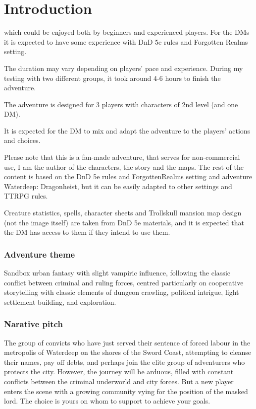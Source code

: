 \documentclass[10pt,onecolumn,twoside,openany,bg=full,layout=true]{dndbook}
\begin{document}
\tableofcontents

\mainmatter

\twocolumn
\chapter{Introduction}\label{ch:introduction}
which could be enjoyed both by beginners and experienced players.
For the DMs it is expected to have some experience with DnD 5e rules and Forgotten Realms setting.

The duration may vary depending on players' pace and experience.
During my testing with two different groups, it took around 4-6 hours to finish the adventure.

The adventure is designed for 3 players with characters of 2nd level (and one DM).

It is expected for the DM to mix and adapt the adventure to the players' actions and choices.

Please note that this is a fan-made adventure, that serves for non-commercial use, I am the author of the characters,
the story and the maps.
The rest of the content is based on the DnD 5e rules and ForgottenRealms setting and adventure Waterdeep: Dragonheist, but it can be easily adapted to other
settings and TTRPG rules.

Creature statistics, spells, character sheets and Trollskull mansion map design (not the image itself) are taken from DnD 5e materials,
and it is expected that the DM has access to them if they intend to use them.


\subsection*{Adventure theme}
Sandbox urban fantasy with slight vampiric influence, following the classic conflict between criminal and ruling forces,
centred particularly on cooperative storytelling with classic elements of dungeon crawling, political intrigue, light settlement building, and exploration.

\subsection*{Narative pitch}
The group of convicts who have just served their sentence of forced labour in the metropolis of Waterdeep on the shores of the Sword Coast,
attempting to cleanse their names, pay off debts, and perhaps join the elite group of adventurers who protects the city.
However, the journey will be arduous, filled with constant conflicts between the criminal underworld and city forces.
But a new player enters the scene with a growing community vying for the position of the masked lord.
The choice is yours on whom to support to achieve your goals.
\end{document}
